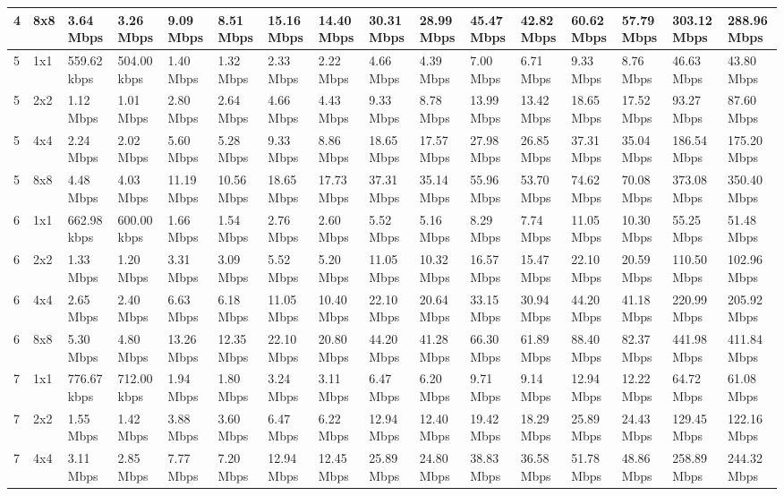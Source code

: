 \documentclass[12pt]{article}
\begin{document}
\begin{longtable}[c]{|l|l|l|l|l|l|l|l|l|l|l|l|l|l|l|l|}
4 & 8x8 & 3.64 Mbps & 3.26 Mbps & 9.09 Mbps & 8.51 Mbps & 15.16 Mbps & 14.40 Mbps & 30.31 Mbps & 28.99 Mbps & 45.47 Mbps & 42.82 Mbps & 60.62 Mbps & 57.79 Mbps & 303.12 Mbps & 288.96 Mbps \\ \hline
5 & 1x1 & 559.62 kbps & 504.00 kbps & 1.40 Mbps & 1.32 Mbps & 2.33 Mbps & 2.22 Mbps & 4.66 Mbps & 4.39 Mbps & 7.00 Mbps & 6.71 Mbps & 9.33 Mbps & 8.76 Mbps & 46.63 Mbps & 43.80 Mbps \\ \hline
5 & 2x2 & 1.12 Mbps & 1.01 Mbps & 2.80 Mbps & 2.64 Mbps & 4.66 Mbps & 4.43 Mbps & 9.33 Mbps & 8.78 Mbps & 13.99 Mbps & 13.42 Mbps & 18.65 Mbps & 17.52 Mbps & 93.27 Mbps & 87.60 Mbps \\ \hline
5 & 4x4 & 2.24 Mbps & 2.02 Mbps & 5.60 Mbps & 5.28 Mbps & 9.33 Mbps & 8.86 Mbps & 18.65 Mbps & 17.57 Mbps & 27.98 Mbps & 26.85 Mbps & 37.31 Mbps & 35.04 Mbps & 186.54 Mbps & 175.20 Mbps \\ \hline
5 & 8x8 & 4.48 Mbps & 4.03 Mbps & 11.19 Mbps & 10.56 Mbps & 18.65 Mbps & 17.73 Mbps & 37.31 Mbps & 35.14 Mbps & 55.96 Mbps & 53.70 Mbps & 74.62 Mbps & 70.08 Mbps & 373.08 Mbps & 350.40 Mbps \\ \hline
6 & 1x1 & 662.98 kbps & 600.00 kbps & 1.66 Mbps & 1.54 Mbps & 2.76 Mbps & 2.60 Mbps & 5.52 Mbps & 5.16 Mbps & 8.29 Mbps & 7.74 Mbps & 11.05 Mbps & 10.30 Mbps & 55.25 Mbps & 51.48 Mbps \\ \hline
6 & 2x2 & 1.33 Mbps & 1.20 Mbps & 3.31 Mbps & 3.09 Mbps & 5.52 Mbps & 5.20 Mbps & 11.05 Mbps & 10.32 Mbps & 16.57 Mbps & 15.47 Mbps & 22.10 Mbps & 20.59 Mbps & 110.50 Mbps & 102.96 Mbps \\ \hline
6 & 4x4 & 2.65 Mbps & 2.40 Mbps & 6.63 Mbps & 6.18 Mbps & 11.05 Mbps & 10.40 Mbps & 22.10 Mbps & 20.64 Mbps & 33.15 Mbps & 30.94 Mbps & 44.20 Mbps & 41.18 Mbps & 220.99 Mbps & 205.92 Mbps \\ \hline
6 & 8x8 & 5.30 Mbps & 4.80 Mbps & 13.26 Mbps & 12.35 Mbps & 22.10 Mbps & 20.80 Mbps & 44.20 Mbps & 41.28 Mbps & 66.30 Mbps & 61.89 Mbps & 88.40 Mbps & 82.37 Mbps & 441.98 Mbps & 411.84 Mbps \\ \hline
7 & 1x1 & 776.67 kbps & 712.00 kbps & 1.94 Mbps & 1.80 Mbps & 3.24 Mbps & 3.11 Mbps & 6.47 Mbps & 6.20 Mbps & 9.71 Mbps & 9.14 Mbps & 12.94 Mbps & 12.22 Mbps & 64.72 Mbps & 61.08 Mbps \\ \hline
7 & 2x2 & 1.55 Mbps & 1.42 Mbps & 3.88 Mbps & 3.60 Mbps & 6.47 Mbps & 6.22 Mbps & 12.94 Mbps & 12.40 Mbps & 19.42 Mbps & 18.29 Mbps & 25.89 Mbps & 24.43 Mbps & 129.45 Mbps & 122.16 Mbps \\ \hline
7 & 4x4 & 3.11 Mbps & 2.85 Mbps & 7.77 Mbps & 7.20 Mbps & 12.94 Mbps & 12.45 Mbps & 25.89 Mbps & 24.80 Mbps & 38.83 Mbps & 36.58 Mbps & 51.78 Mbps & 48.86 Mbps & 258.89 Mbps & 244.32 Mbps \\ \hline

\end{longtable}
\end{document}

